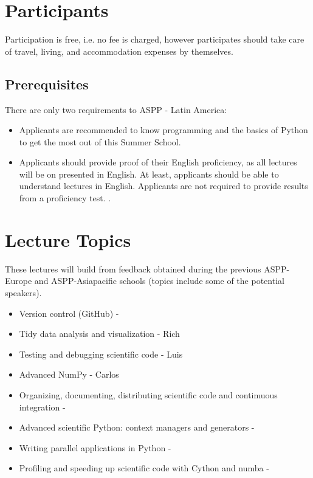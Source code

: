 \documentclass{article}
\begin{document}
\section*{Participants}

Participation is free, i.e. no fee is charged, however participates should take care of travel, living, and accommodation expenses by themselves.

\subsection{Prerequisites}
There are only two requirements to ASPP - Latin America:
\begin{itemize}
    \item Applicants are recommended to know programming and the basics of Python to get the most out of this Summer School.
    \item Applicants should provide proof of their English proficiency, as all lectures will be on presented in English. At least, applicants should be able to understand lectures in English. Applicants are not required to provide results from a proficiency test. .
\end{itemize}

\section*{Lecture Topics}

These lectures will build from feedback obtained during the previous ASPP-Europe and ASPP-Asiapacific schools (topics include some of the potential speakers).

\begin{itemize}
    \item Version control (GitHub) - 
    \item Tidy data analysis and visualization - Rich 
    \item Testing and debugging scientific code - Luis
    \item Advanced NumPy - Carlos
    \item Organizing, documenting, distributing  scientific code and contimuous integration - 
    \item Advanced scientific Python: context managers and generators - 
    \item Writing parallel applications in Python - 
    \item Profiling and speeding up scientific code with Cython and numba - 
\end{itemize}
\end{document}
